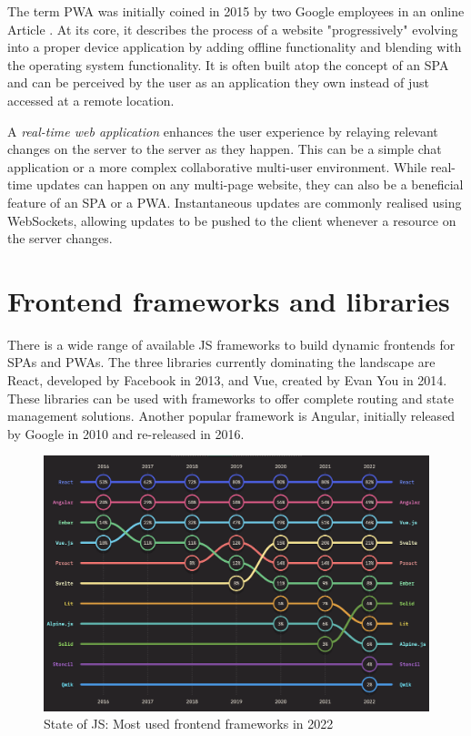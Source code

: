The term \ac{PWA} was initially coined in 2015 by two Google employees in an online Article \parencite{progressiveWebApplications}. At its core, it describes the process of a website "progressively" evolving into a proper device application by adding offline functionality and blending with the operating system functionality. It is often built atop the concept of an \ac{SPA} and can be perceived by the user as an application they own instead of just accessed at a remote location.

A \emph{real-time web application} enhances the user experience by relaying relevant changes on the server to the server as they happen. This can be a simple chat application or a more complex collaborative multi-user environment. While real-time updates can happen on any multi-page website, they can also be a beneficial feature of an \ac{SPA} or a \ac{PWA}. Instantaneous updates are commonly realised using WebSockets, allowing updates to be pushed to the client whenever a resource on the server changes.


\section{Frontend frameworks and libraries}

There is a wide range of available \ac{JS} frameworks to build dynamic frontends for \ac{SPA}s and \ac{PWA}s. The three libraries currently dominating the landscape are React, developed by Facebook in 2013, and Vue, created by Evan You in 2014. These libraries can be used with frameworks to offer complete routing and state management solutions. Another popular framework is Angular, initially released by Google in 2010 and re-released in 2016.

\begin{figure}[h]
    \centering
    \includegraphics[scale=0.4]{04_Artefakte/01_Abbildungen/stateofjs-usage-frontend-frameworks-2022}
    \caption[Most used frontend frameworks in 2022]{State of JS: Most used frontend frameworks in 2022\protect\footnotemark}
    \label{fig:mostUsedFrameworks}
\end{figure}

